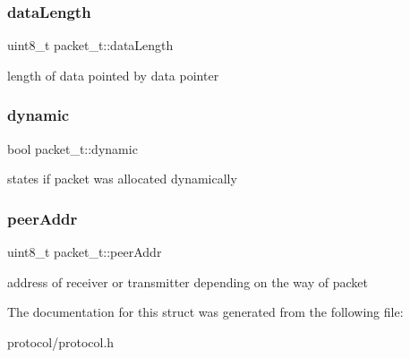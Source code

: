 \subsubsection{\texorpdfstring{data\+Length}{dataLength}}
{\footnotesize\ttfamily uint8\+\_\+t packet\+\_\+t\+::data\+Length}

length of data pointed by data pointer \mbox{\label{structpacket__t_a18a6d2e6ecda8601ae28ac4fd22450ac}} 
\subsubsection{\texorpdfstring{dynamic}{dynamic}}
{\footnotesize\ttfamily bool packet\+\_\+t\+::dynamic}

states if packet was allocated dynamically \mbox{\label{structpacket__t_aa448c0839206ebe76c552b9015eac856}} 
\subsubsection{\texorpdfstring{peer\+Addr}{peerAddr}}
{\footnotesize\ttfamily uint8\+\_\+t packet\+\_\+t\+::peer\+Addr}

address of receiver or transmitter depending on the way of packet 

The documentation for this struct was generated from the following file\+:\begin{DoxyCompactItemize}
\item 
protocol/protocol.\+h\end{DoxyCompactItemize}
